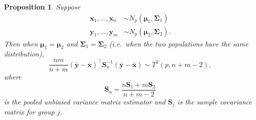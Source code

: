 \documentclass[]{book}
\newtheorem{proposition}{Proposition}[chapter]
\theoremstyle{definition}
\theoremstyle{definition}
\theoremstyle{definition}
\theoremstyle{remark}
\begin{document}
\begin{proposition}
\protect\hypertarget{prp:seven1}{}{\label{prp:seven1} }Suppose
\begin{align*}
\mathbf x_1,\ldots,\mathbf x_n  &\sim N_p({\boldsymbol{\mu}}_1,\boldsymbol{\Sigma}_1)\\ 
\mathbf y_1,\ldots,\mathbf y_m  &\sim N_p({\boldsymbol{\mu}}_2,\boldsymbol{\Sigma}_2). 
\end{align*}
Then when \({\boldsymbol{\mu}}_1 = {\boldsymbol{\mu}}_2\) and \(\boldsymbol{\Sigma}_1 = \boldsymbol{\Sigma}_2\) (i.e.~when the two populations have the same distribution),
\[\frac{nm}{n+m} (\bar{\mathbf y} - \bar{\mathbf x})^\top \mathbf S_u^{-1} (\bar{\mathbf y} - \bar{\mathbf x}) \sim T^2(p,n+m-2),\]
where
\[\mathbf S_u = \frac{n\mathbf S_1 + m\mathbf S_2}{n+m-2}\]
is the pooled unbiased variance matrix estimator
and \(\mathbf S_j\) is the sample covariance matrix for group \(j\).
\end{proposition}
\end{document}
